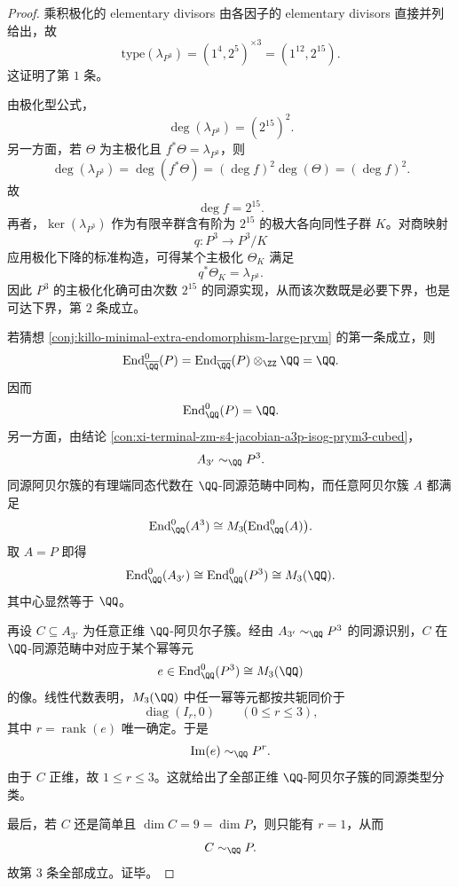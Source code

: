 \begin{proof}
乘积极化的 elementary divisors 由各因子的 elementary divisors 直接并列给出，故
\[
\mathrm{type}(\lambda_{P^3})
=
(1^4,2^5)^{\times 3}
=(1^{12},2^{15}).
\]
这证明了第 \(1\) 条。

由极化型公式，
\[
\deg(\lambda_{P^3})=(2^{15})^2.
\]
另一方面，若 \(\Theta\) 为主极化且 \(f^*\Theta=\lambda_{P^3}\)，则
\[
\deg(\lambda_{P^3})
=
\deg(f^*\Theta)
=
(\deg f)^2\deg(\Theta)
=
(\deg f)^2.
\]
故
\[
\deg f=2^{15}.
\]
再者，\(\ker(\lambda_{P^3})\) 作为有限辛群含有阶为 \(2^{15}\) 的极大各向同性子群 \(K\)。对商映射
\[
q:P^3\to P^3/K
\]
应用极化下降的标准构造，可得某个主极化 \(\Theta_K\) 满足
\[
q^*\Theta_K=\lambda_{P^3}.
\]
因此 \(P^3\) 的主极化化确可由次数 \(2^{15}\) 的同源实现，从而该次数既是必要下界，也是可达下界，第 \(2\) 条成立。

若猜想 \ref{conj:killo-minimal-extra-endomorphism-large-prym} 的第一条成立，则
\[
\operatorname{End}^0_{\overline{\QQ}}(P)
=
\operatorname{End}_{\overline{\QQ}}(P)\otimes_{\ZZ}\QQ
=
\QQ.
\]
因而
\[
\operatorname{End}^0_{\QQ}(P)=\QQ.
\]
另一方面，由结论 \ref{con:xi-terminal-zm-s4-jacobian-a3p-isog-prym3-cubed}，
\[
A_{3'}\sim_{\QQ} P^3.
\]
同源阿贝尔簇的有理端同态代数在 \(\QQ\)-同源范畴中同构，而任意阿贝尔簇 \(A\) 都满足
\[
\operatorname{End}^0_{\QQ}(A^3)\cong
M_3\!\bigl(\operatorname{End}^0_{\QQ}(A)\bigr).
\]
取 \(A=P\) 即得
\[
\operatorname{End}^0_{\QQ}(A_{3'})
\cong
\operatorname{End}^0_{\QQ}(P^3)
\cong
M_3(\QQ).
\]
其中心显然等于 \(\QQ\)。

再设 \(C\subseteq A_{3'}\) 为任意正维 \(\QQ\)-阿贝尔子簇。经由 \(A_{3'}\sim_{\QQ} P^3\) 的同源识别，\(C\) 在 \(\QQ\)-同源范畴中对应于某个幂等元
\[
e\in \operatorname{End}^0_{\QQ}(P^3)\cong M_3(\QQ)
\]
的像。线性代数表明，\(M_3(\QQ)\) 中任一幂等元都按共轭同价于
\[
\operatorname{diag}(I_r,0)\qquad (0\le r\le 3),
\]
其中 \(r=\operatorname{rank}(e)\) 唯一确定。于是
\[
\operatorname{Im}(e)\sim_{\QQ} P^r.
\]
由于 \(C\) 正维，故 \(1\le r\le 3\)。这就给出了全部正维 \(\QQ\)-阿贝尔子簇的同源类型分类。

最后，若 \(C\) 还是简单且 \(\dim C=9=\dim P\)，则只能有 \(r=1\)，从而
\[
C\sim_{\QQ} P.
\]
故第 \(3\) 条全部成立。证毕。
\end{proof}

\endinput
